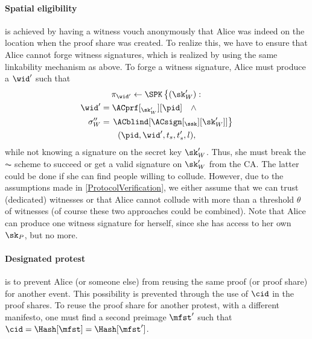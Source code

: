 \paragraph{Spatial eligibility}%
\label{analysis-spatial}

 is achieved by having a witness vouch anonymously that Alice was indeed on the location when the proof share was created.
To realize this, we have to ensure that Alice cannot forge witness signatures, which is realized by using the same linkability mechanism as above.
To forge a witness signature, Alice must produce a \(\wid'\) such that
\begin{multline*}
  \pi_{\wid'}\gets \SPK\left\{ (\sk_W') : \right. \\
    \begin{aligned}
      \wid' &= \ACprf[_{\sk_W'}][\pid] \quad \land \\
      \sigma_W'' &= \left. \ACblind[\ACsign[_{\ssk}][\sk_W']] \right\}
    \end{aligned} \\
      (\pid, \wid', t_s, t_s', l),
\end{multline*}
while not knowing a signature on the secret key \(\sk_W'\).
Thus, she must break the \(\AC\) scheme to succeed or get a valid signature on \(\sk_W'\) from the \ac{CA}.
The latter could be done if she can find people willing to collude.
However, due to the assumptions made in \cref{ProtocolVerification}, we either assume that we can trust (dedicated) witnesses or that Alice cannot collude with more than a threshold \(\theta\) of witnesses (of course these two approaches could be combined).
Note that Alice can produce one witness signature for herself, since she has access to her own \(\sk_P\), but no more.

\paragraph{Designated protest}%
\label{analysis-designated}

 is to prevent Alice (or someone else) from reusing the same proof (or proof share) for another event.
This possibility is prevented through the use of \(\cid\) in the proof shares.
To reuse the proof share for another protest, with a different manifesto, one must find a second preimage \(\mfst'\) such that \(\cid = \Hash[\mfst] = \Hash[\mfst']\).

